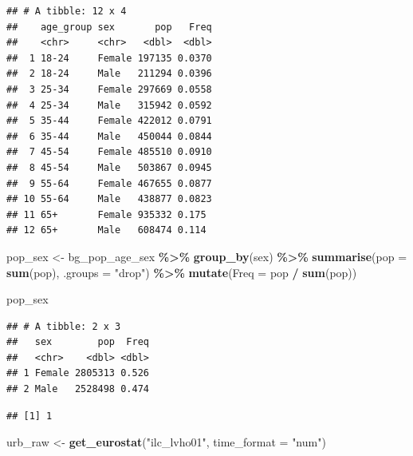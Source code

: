 \documentclass[
]{article}
\newenvironment{Shaded}{\begin{snugshade}}{\end{snugshade}}
\newcommand{\AttributeTok}[1]{\textcolor[rgb]{0.13,0.29,0.53}{#1}}
\newcommand{\FunctionTok}[1]{\textcolor[rgb]{0.13,0.29,0.53}{\textbf{#1}}}
\newcommand{\NormalTok}[1]{#1}
\newcommand{\OtherTok}[1]{\textcolor[rgb]{0.56,0.35,0.01}{#1}}
\newcommand{\SpecialCharTok}[1]{\textcolor[rgb]{0.81,0.36,0.00}{\textbf{#1}}}
\newcommand{\StringTok}[1]{\textcolor[rgb]{0.31,0.60,0.02}{#1}}
\begin{document}
\begin{verbatim}
## # A tibble: 12 x 4
##    age_group sex       pop   Freq
##    <chr>     <chr>   <dbl>  <dbl>
##  1 18-24     Female 197135 0.0370
##  2 18-24     Male   211294 0.0396
##  3 25-34     Female 297669 0.0558
##  4 25-34     Male   315942 0.0592
##  5 35-44     Female 422012 0.0791
##  6 35-44     Male   450044 0.0844
##  7 45-54     Female 485510 0.0910
##  8 45-54     Male   503867 0.0945
##  9 55-64     Female 467655 0.0877
## 10 55-64     Male   438877 0.0823
## 11 65+       Female 935332 0.175 
## 12 65+       Male   608474 0.114
\end{verbatim}

\begin{Shaded}
\begin{Highlighting}[]
\NormalTok{pop\_sex }\OtherTok{\textless{}{-}}\NormalTok{ bg\_pop\_age\_sex }\SpecialCharTok{\%\textgreater{}\%}
  \FunctionTok{group\_by}\NormalTok{(sex) }\SpecialCharTok{\%\textgreater{}\%}
  \FunctionTok{summarise}\NormalTok{(}\AttributeTok{pop =} \FunctionTok{sum}\NormalTok{(pop), }\AttributeTok{.groups =} \StringTok{"drop"}\NormalTok{) }\SpecialCharTok{\%\textgreater{}\%}
  \FunctionTok{mutate}\NormalTok{(}\AttributeTok{Freq =}\NormalTok{ pop }\SpecialCharTok{/} \FunctionTok{sum}\NormalTok{(pop))}

\NormalTok{pop\_sex}
\end{Highlighting}
\end{Shaded}

\begin{verbatim}
## # A tibble: 2 x 3
##   sex        pop  Freq
##   <chr>    <dbl> <dbl>
## 1 Female 2805313 0.526
## 2 Male   2528498 0.474
\end{verbatim}

\begin{Shaded}
\end{Shaded}

\begin{verbatim}
## [1] 1
\end{verbatim}

\begin{Shaded}
\begin{Highlighting}[]
\NormalTok{urb\_raw }\OtherTok{\textless{}{-}} \FunctionTok{get\_eurostat}\NormalTok{(}\StringTok{"ilc\_lvho01"}\NormalTok{, }\AttributeTok{time\_format =} \StringTok{"num"}\NormalTok{)}
\end{Highlighting}
\end{Shaded}
\end{document}
